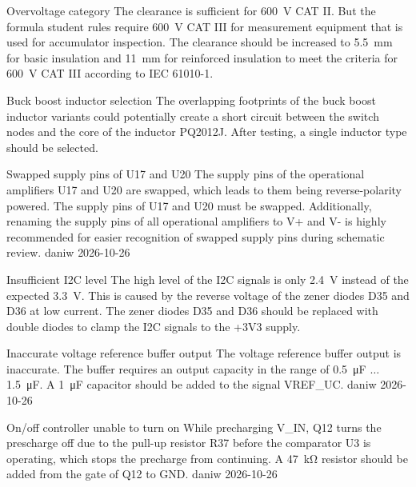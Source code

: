 \begin{ModTable}

\ModItemOpen
{Overvoltage category}
{The clearance is sufficient for \qty{600}{\volt} CAT II. But the formula student rules \cite{FSG:Rules_2026} require \qty{600}{\volt} CAT III for measurement equipment that is used for accumulator inspection. }
{The clearance should be increased to \qty{5.5}{\milli\meter} for basic insulation and \qty{11}{\milli\meter} for reinforced insulation to meet the criteria for \qty{600}{\volt} CAT III according to IEC 61010-1. }
{}
{}

\ModItemOpen
{Buck boost inductor selection}
{The overlapping footprints of the buck boost inductor variants could potentially create a short circuit between the switch nodes and the core of the inductor PQ2012J. }
{After testing, a single inductor type should be selected. }
{}
{}

\ModItemDone
{Swapped supply pins of U17 and U20}
{The supply pins of the operational amplifiers U17 and U20 are swapped, which leads to them being reverse-polarity powered. }
{The supply pins of U17 and U20 must be swapped. \newline Additionally, renaming the supply pins of all operational amplifiers to V+ and V- is highly recommended for easier recognition of swapped supply pins during schematic review. }
{daniw}
{2026-10-26}

\ModItemOpen
{Insufficient \ac{I2C} level}
{The high level of the \ac{I2C} signals is only \qty{2.4}{\volt} instead of the expected \qty{3.3}{\volt}. \newline This is caused by the reverse voltage of the zener diodes D35 and D36 at low current. }
{The zener diodes D35 and D36 should be replaced with double diodes to clamp the \ac{I2C} signals to the +3V3 supply. }
{}
{}

\ModItemDone
{Inaccurate voltage reference buffer output}
{The voltage reference buffer output is inaccurate. The buffer requires an output capacity in the range of \qty{0.5}{\micro\farad} $\ldots$ \qty{1.5}{\micro\farad}. }
{A \qty{1}{\micro\farad} capacitor should be added to the signal VREF\_UC. }
{daniw}
{2026-10-26}

\ModItemDone
{On/off controller unable to turn on}
{While precharging V\_IN, Q12 turns the prescharge off due to the pull-up resistor R37 before the comparator U3 is operating, which stops the precharge from continuing. }
{A \qty{47}{\kilo\ohm} resistor should be added from the gate of Q12 to GND. }
{daniw}
{2026-10-26}


\end{ModTable}
